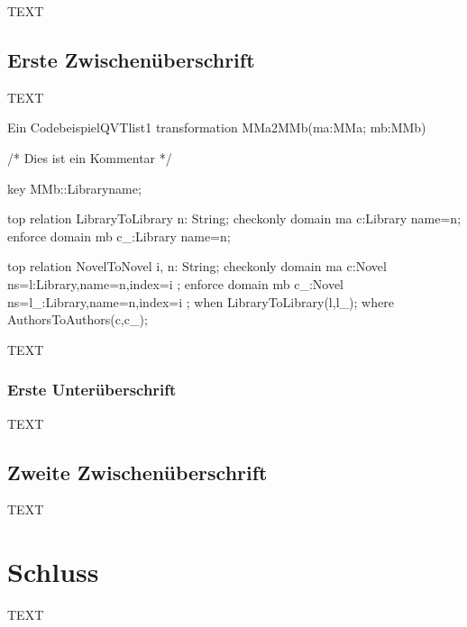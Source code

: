 \documentclass[deutsch,oribibl,a4paper]{llncs}
\begin{document}
TEXT

\subsection{Erste Zwischenüberschrift}
\label{sec:ErsteZwischenueberschrift}

TEXT

\begin{QVTrelation}{Ein Codebeispiel}{QVTlist1} 
transformation MMa2MMb(ma:MMa; mb:MMb) {

/* Dies ist ein Kommentar */

	key MMb::Library{name}; 

	
	top relation LibraryToLibrary {
		n: String;
		checkonly domain ma c:Library {name=n};
		enforce domain mb c_:Library {name=n};
	}
	
	top relation NovelToNovel {
		i, n: String;
		checkonly domain ma c:Novel {ns=l:Library{},name=n,index=i} ;
		enforce domain mb c_:Novel {ns=l_:Library{},name=n,index=i} ;
		when {
			LibraryToLibrary(l,l_);
		}		
		where {
			AuthorsToAuthors(c,c_);
		}
	}
}
\end{QVTrelation}

TEXT

\subsubsection{Erste Unterüberschrift}
\label{sec:ErsteUnterueberschrift}

TEXT

\subsection{Zweite Zwischenüberschrift}
\label{sec:ZweiteZwischenueberschrift}

TEXT

\section{Schluss}
\label{sec:Schluss}

TEXT






\end{document}
